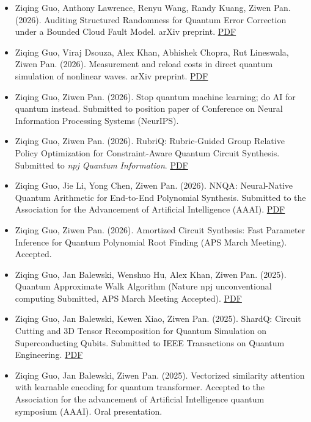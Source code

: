 \documentclass[10pt, letterpaper]{article}
\newenvironment{bulletentries}{%
    \begin{itemize}[topsep=0.10cm, parsep=0.10cm, partopsep=0pt, itemsep=0pt,
                    leftmargin=10pt]
}{%
    \end{itemize}%
}
\begin{document}
\begin{bulletentries}
\item Ziqing Guo, Anthony Lawrence, Renyu Wang, Randy Kuang, Ziwen Pan. (2026).
      Auditing Structured Randomness for Quantum Error Correction under a
      Bounded Cloud Fault Model. arXiv preprint.
      \href{https://arxiv.org/pdf/2608.26600}{PDF}
\item Ziqing Guo, Viraj Dsouza, Alex Khan, Abhishek Chopra, Rut Lineswala,
      Ziwen Pan. (2026). Measurement and reload costs in direct quantum
      simulation of nonlinear waves. arXiv preprint.
      \href{https://arxiv.org/pdf/2608.21647}{PDF}
\item Ziqing Guo, Ziwen Pan. (2026). Stop quantum machine learning; do AI for
      quantum instead. Submitted to position paper of Conference on Neural
      Information Processing Systems (NeurIPS).
\item Ziqing Guo, Ziwen Pan. (2026). RubriQ: Rubric-Guided Group Relative Policy
      Optimization for Constraint-Aware Quantum Circuit Synthesis. Submitted to
      \textit{npj Quantum Information}.
      \href{https://arxiv.org/pdf/2607.07554}{PDF}
\item Ziqing Guo, Jie Li, Yong Chen, Ziwen Pan. (2026). NNQA: Neural-Native
      Quantum Arithmetic for End-to-End Polynomial Synthesis. Submitted to the
      Association for the Advancement of Artificial Intelligence (AAAI).
      \href{https://arxiv.org/pdf/2603.27297}{PDF}
\item Ziqing Guo, Ziwen Pan. (2026). Amortized Circuit Synthesis: Fast Parameter
      Inference for Quantum Polynomial Root Finding (APS March Meeting).
      Accepted.
\item Ziqing Guo, Jan Balewski, Wenshuo Hu, Alex Khan, Ziwen Pan. (2025).
      Quantum Approximate Walk Algorithm (Nature npj unconventional computing
      Submitted, APS March Meeting Accepted).
      \href{https://arxiv.org/pdf/2511.07676}{PDF}
\item Ziqing Guo, Jan Balewski, Kewen Xiao, Ziwen Pan. (2025). ShardQ: Circuit
      Cutting and 3D Tensor Recomposition for Quantum Simulation on
      Superconducting Qubits. Submitted to IEEE Transactions on Quantum
      Engineering.
      \href{https://arxiv.org/pdf/2511.05492}{PDF}
\item Ziqing Guo, Jan Balewski, Ziwen Pan. (2025). Vectorized similarity
      attention with learnable encoding for quantum transformer. Accepted to the
      Association for the advancement of Artificial Intelligence quantum
      symposium (AAAI). Oral presentation.

\end{bulletentries}
\end{document}
